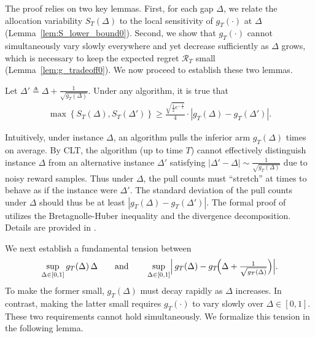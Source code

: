 \documentclass[nonblindrev]{informs3_noinforms}
\begin{document}
The proof relies on two key lemmas. First, for each gap $\Delta$, we relate the allocation variability $S_T(\Delta)$ to the local sensitivity of $g_T(\cdot)$ at $\Delta$ (Lemma~\ref{lem:S_lower_bound0}). Second, we show that $g_T(\cdot)$ cannot simultaneously vary slowly everywhere and yet decrease sufficiently as $\Delta$ grows, which is necessary to keep the expected regret $\mathcal{R}_T$ small (Lemma~\ref{lem:g_tradeoff0}). We now proceed to establish these two lemmas.
\begin{lemma}\label{lem:S_lower_bound0}
    Let $\Delta'\triangleq  \Delta + \frac{1}{\sqrt{g_T(\Delta)}}.$ Under any algorithm, it is true that
    \begin{align*}
         \max\left\{S_T(\Delta), S_T\left(\Delta'\right)\right\}\geq\frac{\sqrt{\frac{1}{2}e^{-\frac{1}{2}}}}{4}\cdot\left|g_T(\Delta)-g_T\left(\Delta'\right)\right|.
    \end{align*}
\end{lemma}
Intuitively, under instance $\Delta$, an algorithm pulls the inferior arm $g_T(\Delta)$ times on average. By CLT, the algorithm (up to time $T$) cannot effectively distinguish instance $\Delta$ from an alternative instance $\Delta'$ satisfying $|\Delta' - \Delta| \sim \frac{1}{\sqrt{g_T(\Delta)}}$ due to noisy reward samples. Thus under $\Delta$, the pull counts must ``stretch'' at times to behave as if the instance were $\Delta'$. The standard deviation of the pull counts under $\Delta$ should thus be at least $\left|g_T(\Delta)-g_T\left(\Delta'\right)\right|$. The formal proof of  utilizes the Bretagnolle-Huber inequality and the divergence decomposition. Details are provided in .


We next establish a fundamental tension between
\[
\sup_{\Delta\in[0,1]} g_T(\Delta)\,\Delta
\qquad\text{and}\qquad
\sup_{\Delta\in[0,1]}\Bigl|\,g_T(\Delta)-g_T\!\Bigl(\Delta+\tfrac{1}{\sqrt{g_T(\Delta)}}\Bigr)\Bigr|.
\]
To make the former small, $g_T(\Delta)$ must decay rapidly as $\Delta$ increases. In contrast, making the latter small requires $g_T(\cdot)$ to vary slowly over $\Delta\in[0,1]$. These two requirements cannot hold simultaneously. We formalize this tension in the following lemma.
\end{document}

